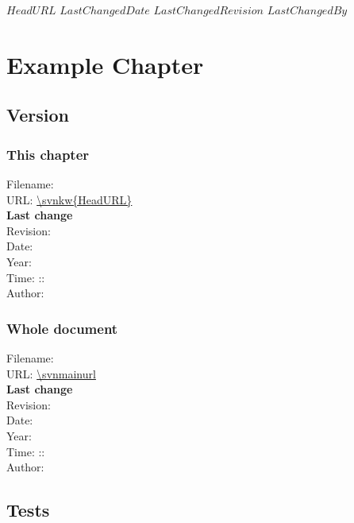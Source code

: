 \svnidlong
{$HeadURL$}
{$LastChangedDate$}
{$LastChangedRevision$}
{$LastChangedBy$}

\chapter{Example Chapter}

\section{Version}
\subsection*{This chapter}
Filename: \\
URL: \url{\svnkw{HeadURL}}\\
\textbf{Last change}\\
Revision: \svnfilerev\\
Date: \svnfiledate\\
Year: \svnfileyear\\
Time: \svnfilehour:\svnfileminute:\svnfilesecond\ \\
Author: \svnfileauthor\\

\subsection*{Whole document}
Filename: \svnnolinkurl{\svnmainfilename}\\
URL: \url{\svnmainurl}\\
\textbf{Last change}\\
Revision: \svnrev\\
Date: \svndate\\
Year: \svnyear\\
Time: \svnhour:\svnminute:\svnsecond\ \\
Author: \svnauthor\\

\section{Tests}

